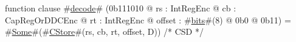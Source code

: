 function clause #\hyperref[zdecode]{decode}# (0b111010 @ rs : IntRegEnc @ cb : CapRegOrDDCEnc @ rt : IntRegEnc @ offset : #\hyperref[zbits]{bits}#(8) @ 0b0 @ 0b11) = #\hyperref[zSome]{Some}#(#\hyperref[zCStore]{CStore}#(rs, cb, rt, offset, D)) /* CSD */
